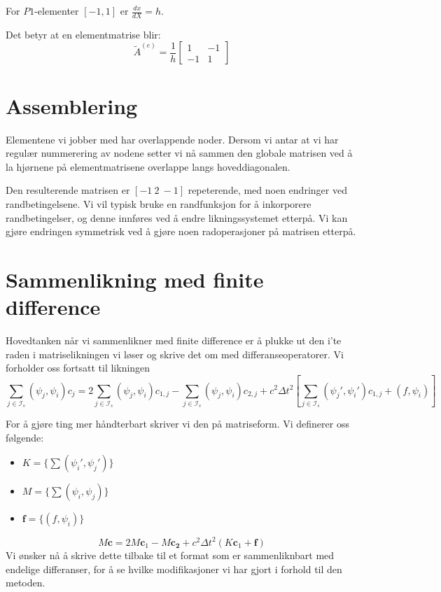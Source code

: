 \documentclass[a4paper, 10pt]{article}
\newcommand{\mb}{\mathbf}
\newcommand{\mc}{\mathcal}
\begin{document}
For $P1$-elementer $[-1, 1]$ er $\frac{dx}{dX} = h$.

Det betyr at en elementmatrise blir:
\begin{equation}
\tilde{A}^{(e)} =\frac{1}{h}\left[	
\begin{array}{cc}
1 & -1 \\
-1 & 1 
\end{array}
\right]
\end{equation}

\section{Assemblering}
Elementene vi jobber med har overlappende noder. Dersom vi antar at vi har regulær nummerering av nodene setter vi nå sammen den globale matrisen ved å la hjørnene på elementmatrisene overlappe langs hoveddiagonalen. 

Den resulterende matrisen er $[-1 \ 2 \ -1]$ repeterende, med noen endringer ved randbetingelsene. Vi vil typisk bruke en randfunksjon for å inkorporere randbetingelser, og denne innføres ved å endre likningssystemet etterpå. Vi kan gjøre endringen symmetrisk ved å gjøre noen radoperasjoner på matrisen etterpå.

\section{Sammenlikning med finite difference}
Hovedtanken når vi sammenlikner med finite difference er å plukke ut den i'te raden i matriselikningen vi løser og skrive det om med differanseoperatorer. 
Vi forholder oss fortsatt til likningen
\begin{equation}
	\sum_{j \in \mc{I}_s } (\psi_j, \psi_i)c_j = 2\sum_{j \in \mc{I}_s }(\psi_j, \psi_i)c_{1, j} - \sum_{j \in \mc{I}_s }(\psi_j, \psi_i)c_{2, j} + c^2\Delta t^2 \left[\sum_{j \in \mc{I}_s } (\psi_j', \psi_i')c_{1, j} + (f, \psi_i)\right]
\end{equation}

For å gjøre ting mer håndterbart skriver vi den på matriseform.
Vi definerer oss følgende:
\begin{itemize}
\item $K = \{\sum (\psi_i', \psi_j')\}$
\item $M = \{\sum (\psi_i, \psi_j)\}$
\item $\mb{f} = \{(f, \psi_i)\}$
\end{itemize}

\begin{equation}
	M\mb{c} = 2M\mb{c}_1 - M\mb{c_2} + c^2\Delta t^2 (K\mb{c}_1 + \mb{f})
\end{equation}
Vi ønsker nå å skrive dette tilbake til et format som er sammenliknbart med endelige differanser, for å se hvilke modifikasjoner vi har gjort i forhold til den metoden.
\end{document}
